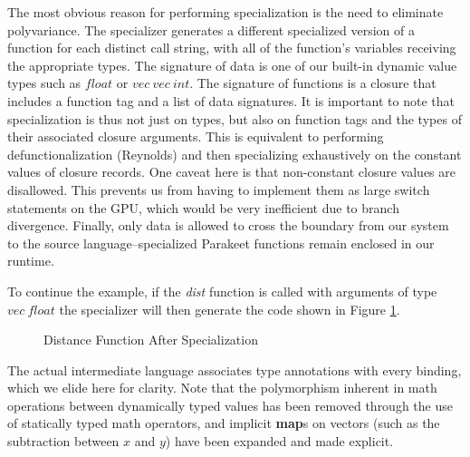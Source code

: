 \documentclass[preprint]{sigplanconf}
\begin{document}
The most obvious reason for performing specialization is the need to eliminate
polyvariance.  The specializer generates a different specialized version
of a function for each distinct call string, with all of the function's
variables receiving the appropriate types.  The signature of data is one of our
built-in dynamic value types such as $float$ or $vec~vec~int$.  The signature of
functions is a closure that includes a function tag and a list of data
signatures.  It is important to note that specialization is thus not just on
types, but also on function tags and the types of their associated closure
arguments. This is equivalent to performing defunctionalization (Reynolds) and
then specializing exhaustively on the constant values of closure records. One
caveat here is that non-constant closure values are disallowed.  This prevents
us from having to implement them as large switch statements on the GPU, which
would be very inefficient due to branch divergence.  Finally, only data is
allowed to cross the boundary from our system to the source
language--specialized Parakeet functions remain enclosed in our runtime.

To continue the example, if the \textit{dist} function is called with arguments
of type $vec~ float$ the specializer will then generate the code shown in Figure
\ref{SpecDist}.

\begin{figure}[h!]
\caption{Distance Function After Specialization}
\label{SpecDist}
\end{figure}

The actual intermediate language associates type annotations with every binding,
which we elide here for clarity. Note that the polymorphism inherent in math
operations between dynamically typed values has been removed through the use of
statically typed math operators, and implicit \textbf{map}s on vectors (such
as the subtraction between $x$ and $y$) have been expanded and made explicit.
\end{document}
